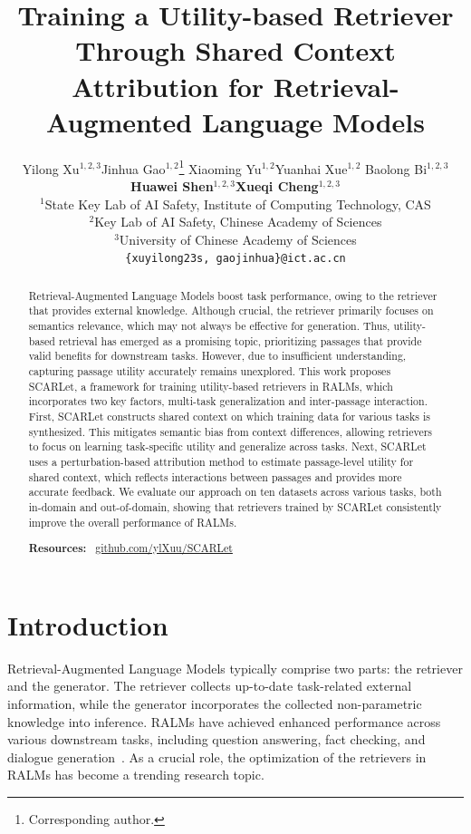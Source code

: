 \documentclass[11pt]{article}
\title{Training a Utility-based Retriever Through Shared Context Attribution for Retrieval-Augmented Language Models}
\author{Yilong Xu$^{1,2,3}$\quad Jinhua Gao$^{1,2}$\thanks{Corresponding author.} \quad Xiaoming Yu$^{1,2}$\quad Yuanhai Xue$^{1,2}$ \quad Baolong Bi$^{1,2,3}$ \\ \textbf{Huawei Shen}$^{1,2,3}$\quad \textbf{Xueqi Cheng}$^{1,2,3}$\quad \\
$^1$State Key Lab of AI Safety, Institute of Computing Technology, CAS \\
$^2$Key Lab of AI Safety, Chinese Academy of Sciences \\
$^3$University of Chinese Academy of Sciences \\
\texttt{\small{\{xuyilong23s, gaojinhua\}@ict.ac.cn}}
}
\begin{document}
\maketitle

\begin{abstract}

Retrieval-Augmented Language Models boost task performance, owing to the retriever that provides external knowledge.
Although crucial, the retriever primarily focuses on semantics relevance, which may not always be effective for generation.
Thus, utility-based retrieval has emerged as a promising topic, prioritizing passages that provide valid benefits for downstream tasks. 
However, due to insufficient understanding, capturing passage utility accurately remains unexplored.
This work proposes SCARLet, a framework for training utility-based retrievers in RALMs, which incorporates two key factors, multi-task generalization and inter-passage interaction.
First, SCARLet constructs shared context on which training data for various tasks is synthesized.
This mitigates semantic bias from context differences, allowing retrievers to focus on learning task-specific utility and generalize across tasks.
Next, SCARLet uses a perturbation-based attribution method to estimate passage-level utility for shared context, which reflects interactions between passages and provides more accurate feedback.
We evaluate our approach on ten datasets across various tasks, both in-domain and out-of-domain, showing that retrievers trained by SCARLet consistently improve the overall performance of RALMs.

\noindent\textbf{Resources:} \faGithub\ \href{https://github.com/ylXuu/SCARLet}{github.com/ylXuu/SCARLet}

\end{abstract}



\section{Introduction}

Retrieval-Augmented Language Models \citep[RALMs;][]{rag_lewis_2020} typically comprise two parts: the retriever and the generator. The retriever collects up-to-date task-related external information, while the generator incorporates the collected non-parametric knowledge into inference. RALMs have achieved enhanced performance across various downstream tasks, including question answering, fact checking, and dialogue generation~\citep{shao2023enhancingretrievalaugmentedlargelanguage, lift_yourself_up}. As a crucial role, the optimization of the retrievers in RALMs has become a trending research topic.
\end{document}
